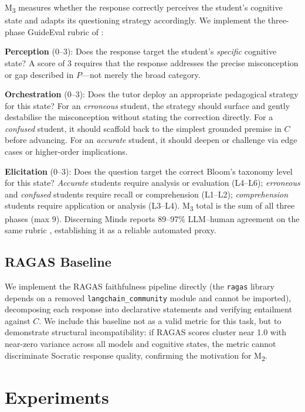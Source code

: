 \documentclass[11pt]{article}
\newcommand{\mtwo}{M\textsubscript{2}\xspace}
\newcommand{\mthree}{M\textsubscript{3}\xspace}
\begin{document}
\mthree measures whether the response correctly perceives the student's
cognitive state and adapts its questioning strategy accordingly.
We implement the three-phase GuideEval rubric of
\citet{liuy2025discerning}:

\textbf{Perception} (0--3): Does the response target the student's
\textit{specific} cognitive state?
A score of 3 requires that the response addresses the precise misconception
or gap described in $P$---not merely the broad category.

\textbf{Orchestration} (0--3): Does the tutor deploy an appropriate
pedagogical strategy for this state?
For an \textit{erroneous} student, the strategy should surface and gently
destabilise the misconception without stating the correction directly.
For a \textit{confused} student, it should scaffold back to the simplest
grounded premise in $C$ before advancing.
For an \textit{accurate} student, it should deepen or challenge via
edge cases or higher-order implications.

\textbf{Elicitation} (0--3): Does the question target the correct
Bloom's taxonomy level \citep{krathwohl2002revision} for this state?
\textit{Accurate} students require analysis or evaluation (L4--L6);
\textit{erroneous} and \textit{confused} students require recall or
comprehension (L1--L2);
\textit{comprehension} students require application or analysis (L3--L4).
\mthree total is the sum of all three phases (max 9).
Discerning Minds reports 89--97\% LLM--human agreement on the same rubric
\citep{liuy2025discerning}, establishing it as a reliable automated proxy.

\subsection{RAGAS Baseline}

We implement the RAGAS faithfulness pipeline \citep{es2024ragas} directly
(the \texttt{ragas} library depends on a removed \texttt{langchain\_community}
module and cannot be imported), decomposing each response into declarative
statements and verifying entailment against $C$.
We include this baseline not as a valid metric for this task, but to
demonstrate structural incompatibility: if RAGAS scores cluster near 1.0
with near-zero variance across all models and cognitive states, the metric
cannot discriminate Socratic response quality, confirming the motivation for
\mtwo.

\section{Experiments}
\label{sec:experiments}
\end{document}

